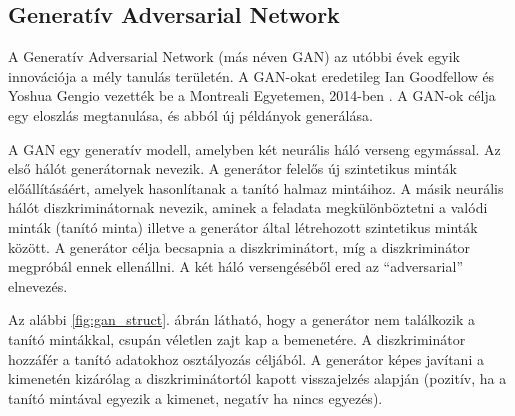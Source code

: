 \subsection{Generatív Adversarial Network}

A Generatív Adversarial Network (más néven GAN) az utóbbi évek egyik innovációja a mély tanulás területén. A GAN-okat eredetileg Ian Goodfellow és Yoshua Gengio vezették be a Montreali Egyetemen, 2014-ben \cite{fig:gan_dist}. A GAN-ok célja egy eloszlás megtanulása, és abból új példányok generálása.

A GAN egy generatív modell, amelyben két neurális háló verseng egymással. Az első hálót generátornak nevezik. A generátor felelős új szintetikus minták előállításáért, amelyek hasonlítanak a tanító halmaz mintáihoz. A másik neurális hálót diszkriminátornak nevezik, aminek a feladata megkülönböztetni a valódi minták (tanító minta) illetve a generátor által létrehozott szintetikus minták között. A generátor célja becsapnia a diszkriminátort, míg a diszkriminátor megpróbál ennek ellenállni. A két háló versengéséből ered az ``adversarial'' elnevezés.

Az alábbi \ref{fig:gan_struct}. ábrán látható, hogy a generátor nem találkozik a tanító mintákkal, csupán véletlen zajt kap a bemenetére. A diszkriminátor hozzáfér a tanító adatokhoz osztályozás céljából. A generátor képes javítani a kimenetén kizárólag a diszkriminátortól kapott visszajelzés alapján (pozitív, ha a tanító mintával egyezik a kimenet, negatív ha nincs egyezés).



